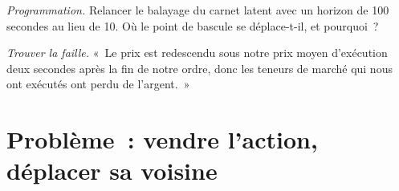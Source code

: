 \begin{exercise}[$\star\star\star$]\label{exo:mx:metaorders-latent-liquidity-and-cross-impact:7}
\emph{Programmation.} Relancer le balayage du carnet latent avec un horizon de 100 secondes au lieu de 10. Où le point de bascule se déplace-t-il, et pourquoi~?
\end{exercise}

\begin{exercise}[$\star\star\star$]\label{exo:mx:metaorders-latent-liquidity-and-cross-impact:8}
\emph{Trouver la faille.} «~Le prix est redescendu sous notre prix moyen d'exécution deux secondes après la fin de notre ordre, donc les teneurs de marché qui nous ont exécutés ont perdu de l'argent.~»
\end{exercise}

\section{Problème~: vendre l'action, déplacer sa voisine}


